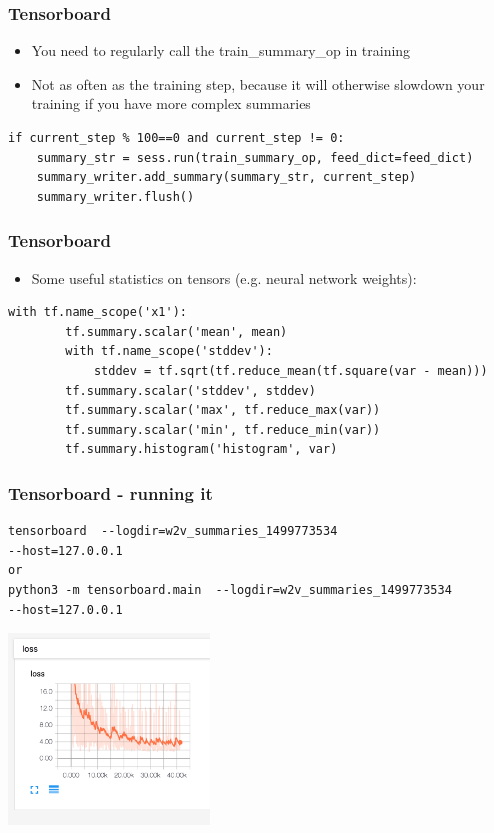 \documentclass{beamer}
\begin{document}
\begin{frame}[fragile]
 
 \frametitle{Tensorboard}
  \begin{itemize}
		\item You need to regularly call the train\_summary\_op in training
		\item Not as often as the training step, because it will otherwise slowdown your training if you have more complex summaries
	\end{itemize}
			
\begin{tiny}
\begin{lstlisting}
if current_step % 100==0 and current_step != 0:
	summary_str = sess.run(train_summary_op, feed_dict=feed_dict)
	summary_writer.add_summary(summary_str, current_step)
	summary_writer.flush()
\end{lstlisting}   
\end{tiny}    
	
\end{frame}

\begin{frame}[fragile]
 
 \frametitle{Tensorboard}
  \begin{itemize}
		\item Some useful statistics on tensors (e.g. neural network weights):
	\end{itemize}
\begin{tiny}
\begin{lstlisting}
with tf.name_scope('x1'):
        tf.summary.scalar('mean', mean)
        with tf.name_scope('stddev'):
            stddev = tf.sqrt(tf.reduce_mean(tf.square(var - mean)))
        tf.summary.scalar('stddev', stddev)
        tf.summary.scalar('max', tf.reduce_max(var))
        tf.summary.scalar('min', tf.reduce_min(var))
        tf.summary.histogram('histogram', var)
\end{lstlisting}   
\end{tiny}  
\end{frame}


\begin{frame}[fragile]
 \frametitle{Tensorboard - running it}
 \begin{tiny}
 \begin{lstlisting}
tensorboard  --logdir=w2v_summaries_1499773534
--host=127.0.0.1
or
python3 -m tensorboard.main  --logdir=w2v_summaries_1499773534
--host=127.0.0.1
\end{lstlisting}   
\end{tiny}
 \includegraphics[width=0.4\textwidth]{04_loss}
\end{frame}
\end{document}
